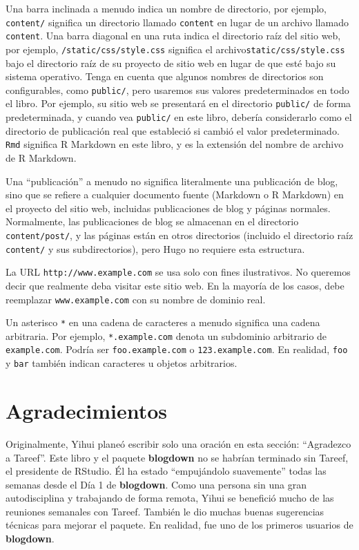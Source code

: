 \documentclass[12pt,]{krantz}
\theoremstyle{definition}
\theoremstyle{definition}
\theoremstyle{definition}
\theoremstyle{remark}
\begin{document}
Una barra inclinada a menudo indica un nombre de directorio, por
ejemplo, \texttt{content/} significa un directorio llamado
\texttt{content} en lugar de un archivo llamado \texttt{content}. Una
barra diagonal en una ruta indica el directorio raíz del sitio web, por
ejemplo, \texttt{/static/css/style.css} significa el
archivo\texttt{static/css/style.css} bajo el directorio raíz de su
proyecto de sitio web en lugar de que esté bajo su sistema operativo.
Tenga en cuenta que algunos nombres de directorios son configurables,
como \texttt{public/}, pero usaremos sus valores predeterminados en todo
el libro. Por ejemplo, su sitio web se presentará en el directorio
\texttt{public/} de forma predeterminada, y cuando vea \texttt{public/}
en este libro, debería considerarlo como el directorio de publicación
real que estableció si cambió el valor predeterminado. \texttt{Rmd}
significa R Markdown en este libro, y es la extensión del nombre de
archivo de R Markdown.

Una ``publicación'' a menudo no significa literalmente una publicación
de blog, sino que se refiere a cualquier documento fuente (Markdown o R
Markdown) en el proyecto del sitio web, incluidas publicaciones de blog
y páginas normales. Normalmente, las publicaciones de blog se almacenan
en el directorio \texttt{content/post/}, y las páginas están en otros
directorios (incluido el directorio raíz \texttt{content/} y sus
subdirectorios), pero Hugo no requiere esta estructura.

La URL \texttt{http://www.example.com} se usa solo con fines
ilustrativos. No queremos decir que realmente deba visitar este sitio
web. En la mayoría de los casos, debe reemplazar
\texttt{www.example.com} con su nombre de dominio real.

Un asterisco \texttt{*} en una cadena de caracteres a menudo significa
una cadena arbitraria. Por ejemplo, \texttt{*.example.com} denota un
subdominio arbitrario de \texttt{example.com}. Podría ser
\texttt{foo.example.com} o \texttt{123.example.com}. En realidad,
\texttt{foo} y \texttt{bar} también indican caracteres u objetos
arbitrarios.

\hypertarget{agradecimientos}{%
\section*{Agradecimientos}\label{agradecimientos}}


Originalmente, Yihui planeó escribir solo una oración en esta sección:
``Agradezco a Tareef''. Este libro y el paquete \textbf{blogdown} no se
habrían terminado sin Tareef, el presidente de RStudio. Él ha estado
``empujándolo suavemente'' todas las semanas desde el Día 1 de
\textbf{blogdown}. Como una persona sin una gran autodisciplina y
trabajando de forma remota, Yihui se benefició mucho de las reuniones
semanales con Tareef. También le dio muchas buenas sugerencias técnicas
para mejorar el paquete. En realidad, fue uno de los primeros usuarios
de \textbf{blogdown}.
\end{document}
